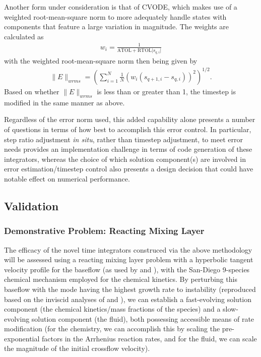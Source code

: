 Another form under consideration is that of CVODE, which makes use of a weighted
root-mean-square norm to more adequately handle states with components that
feature a large variation in magnitude. The weights are calculated as
\begin{align}
w_{i} = \frac{1}{\text{ATOL} + \text{RTOL} \lvert s_{q,i} \rvert}
\end{align}
with the weighted root-mean-square norm then being given by
\begin{align}
\|E\|_{wrms} = \left(\sum_{i=1}^{N} \frac{1}{N} (w_{i}(s_{q+1,i} - s_{q,i}))^2 \right)^{1/2}.
\end{align}
Based on whether $\|E\|_{wrms}$ is less than or greater than 1, the timestep
is modified in the same manner as above.

Regardless of the error norm used, this added capability alone presents a number of
questions in terms of how best to accomplish this error control. In particular,
step ratio adjustment \emph{in situ}, rather than timestep adjustment, to meet error
needs provides an implementation challenge in terms of code generation of these
integrators, whereas the choice of which solution component(s) are involved in error
estimation/timestep control also presents a design decision that could have notable
effect on numerical performance.

\subsection{Validation}

\subsubsection{Demonstrative Problem: Reacting Mixing Layer}

The efficacy of the novel time integrators construced via the above methodology will
be assessed using a reacting mixing layer problem with a hyperbolic tangent velocity profile
for the baseflow (as used by \cite{michalke1964inviscid} and \cite{blumen1970shear}), with
the San-Diego 9-species chemical mechanism employed for the chemical kinetics. By perturbing
this baseflow with the mode having the highest growth rate to instability (reproduced based
on the inviscid analyses of \cite{michalke1964inviscid} and \cite{blumen1970shear}), we can
establish a fast-evolving solution component (the chemical kinetics/mass fractions of the
species) and a slow-evolving solution component (the fluid), both possessing accessible
means of rate modification (for the chemistry, we can accomplish this by scaling the
pre-exponential factors in the Arrhenius reaction rates, and for the fluid, we can scale
the magnitude of the initial crossflow velocity).

